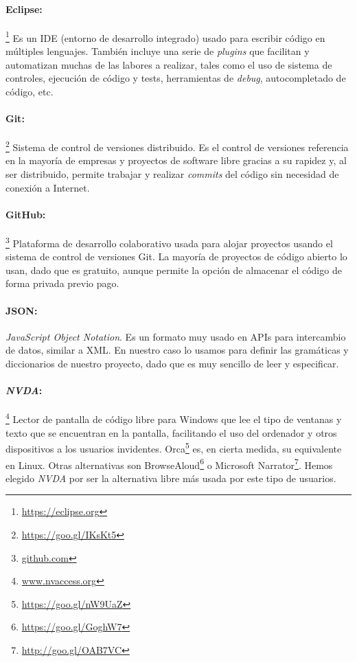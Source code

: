  \paragraph{Eclipse:}\footnote{\url{https://eclipse.org}} Es un IDE (entorno de desarrollo integrado) usado para escribir código en múltiples lenguajes. También incluye una serie de \textit{plugins} que facilitan y automatizan muchas de las labores a realizar, tales como el uso de sistema de controles, ejecución de código y tests, herramientas de \textit{debug}, autocompletado de código, etc.

 \paragraph{Git:}\footnote{\url{https://goo.gl/IKsKt5}} Sistema de control de versiones distribuido. Es el control de versiones referencia en la mayoría de empresas y proyectos de software libre gracias a su rapidez y, al ser distribuido, permite trabajar y realizar \textit{commits} del código sin necesidad de conexión a Internet.

 \paragraph{GitHub:}\footnote{\url{github.com}} Plataforma de desarrollo colaborativo usada para alojar proyectos usando el sistema de control de versiones Git. La mayoría de proyectos de código abierto lo usan, dado que es gratuito, aunque permite la opción de almacenar el código de forma privada previo pago.

\paragraph{JSON:} \textit{JavaScript Object Notation}. Es un formato muy usado en APIs para intercambio de datos, similar a XML. En nuestro caso lo usamos para definir las gramáticas y diccionarios de nuestro proyecto, dado que es muy sencillo de leer y especificar.

\paragraph{\textit{NVDA}:}\footnote{\url{www.nvaccess.org}} Lector de pantalla de código libre para Windows que lee el tipo de ventanas y texto que se encuentran en la pantalla, facilitando el uso del ordenador y otros dispositivos a los usuarios invidentes. 
Orca\footnote{\url{https://goo.gl/nW9UaZ}} es, en cierta medida, su equivalente en Linux. Otras alternativas son BrowseAloud\footnote{\url{https://goo.gl/GoghW7}} o Microsoft Narrator\footnote{\url{http://goo.gl/OAB7VC}}. Hemos elegido \textit{NVDA} por ser la alternativa libre más usada por este tipo de usuarios.

